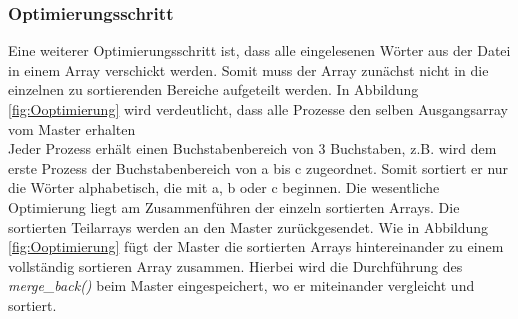 \subsubsection{Optimierungsschritt}
\label{Optimierung3}
Eine weiterer Optimierungsschritt ist, dass alle eingelesenen Wörter aus der Datei in einem Array verschickt werden. Somit muss der Array zunächst nicht in die einzelnen zu sortierenden Bereiche aufgeteilt werden. In Abbildung \ref{fig:Ooptimierung} wird verdeutlicht, dass alle Prozesse den selben Ausgangsarray vom Master erhalten \\
Jeder Prozess erhält einen Buchstabenbereich von 3 Buchstaben, z.B. wird dem erste Prozess der Buchstabenbereich von a bis c zugeordnet. Somit sortiert er nur die Wörter alphabetisch, die mit a, b oder c beginnen.
Die wesentliche Optimierung liegt am Zusammenführen der einzeln sortierten Arrays. 
Die sortierten Teilarrays werden an den Master zurückgesendet. Wie in Abbildung \ref{fig:Ooptimierung} fügt der Master die sortierten Arrays hintereinander zu einem vollständig sortieren Array zusammen. Hierbei wird die Durchführung des \textit{merge\_back()} beim Master eingespeichert, wo er miteinander vergleicht und sortiert. \\


